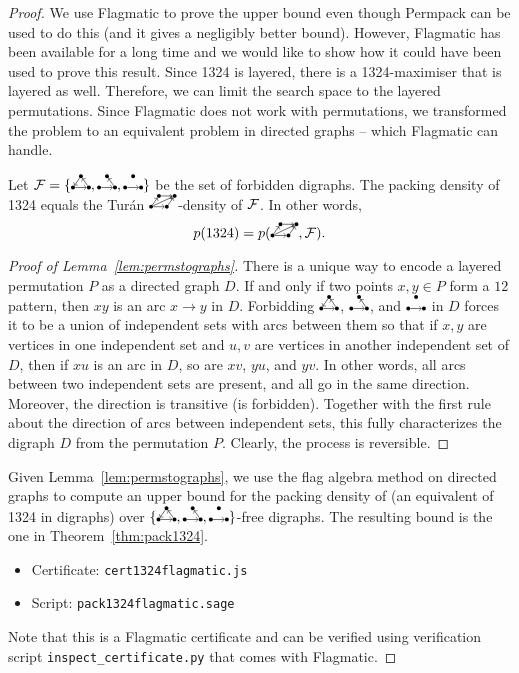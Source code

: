 \documentclass[12pt, a4paper, twoside]{report}
\begin{document}
\begin{proof}
We use Flagmatic to prove the upper bound even though Permpack can be used to do this (and it gives a negligibly better bound). However, Flagmatic has been available for a long time and we would like to show how it could have been used to prove this result. Since 1324 is layered, there is a 1324-maximiser that is layered as well. Therefore, we can limit the search space to the layered permutations. Since Flagmatic does not work with permutations, we transformed the problem to an equivalent problem in directed graphs -- which Flagmatic can handle. 
\begin{lemma}
\label{lem:permstographs}
Let $\F = \{\dicycle, \twochain, \orcocherry\}$ be the set of forbidden digraphs.  The packing density of 1324 equals the Tur\'an $\digraphacbd$-density of $\mathcal{F}$. In other words, $$p(1324)= p(\digraphacbd, \F).$$
\end{lemma}
\begin{proof}[Proof of Lemma~\ref{lem:permstographs}]
There is a unique way to encode a layered permutation $P$ as a directed graph $D$. If and only if two points $x,y \in P$ form a $12$ pattern, then $xy$ is an arc $x \to y$ in $D$. Forbidding $\dicycle$, $\twochain$, and $\orcocherry$ in $D$ forces it to be a union of independent sets with arcs between them so that if $x,y$ are vertices in one independent set and $u,v$ are vertices in another independent set of $D$, then if $xu$ is an arc in $D$, so are $xv$, $yu$, and $yv$. In other words, all arcs between two independent sets are present, and all go in the same direction. Moreover, the direction is transitive (\dicycle is forbidden). Together with the first rule about the direction of arcs between independent sets, this fully characterizes the digraph $D$ from the permutation $P$. Clearly, the process is reversible.
\end{proof}

Given Lemma~\ref{lem:permstographs}, we use the flag algebra method on directed graphs to compute an upper bound for the packing density of \digraphacbd (an equivalent of 1324 in digraphs) over $\{\dicycle, \twochain, \orcocherry\}$-free digraphs. The resulting bound is the one in Theorem~\ref{thm:pack1324}.
\begin{itemize}
\item Certificate: \texttt{cert1324flagmatic.js}
\item Script: \texttt{pack1324flagmatic.sage}
\end{itemize}
Note that this is a Flagmatic certificate and can be verified using verification script \texttt{inspect\_certificate.py} that comes with Flagmatic.


\end{proof}
\end{document}
